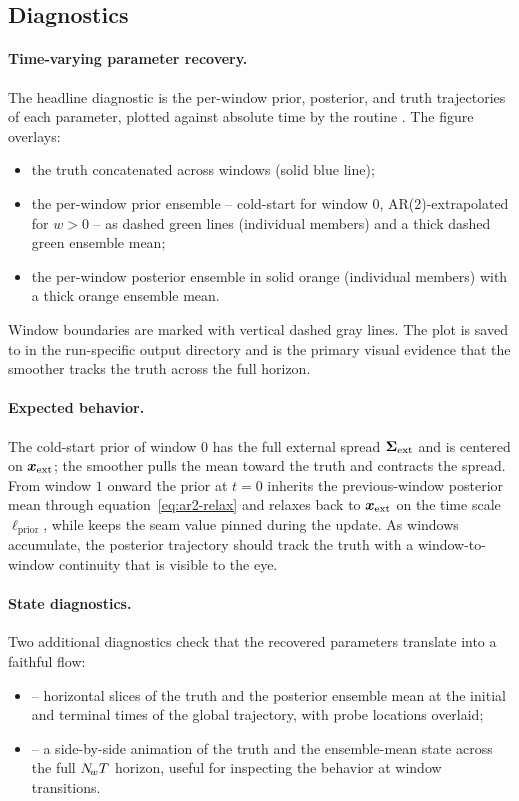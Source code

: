 \subsection{Diagnostics}

\paragraph{Time-varying parameter recovery.}
The headline diagnostic is the per-window prior, posterior, and
truth trajectories of each parameter, plotted against absolute time
by the routine \plothelper{}.  The
figure overlays:
\begin{itemize}
  \item the truth concatenated across windows (solid blue line);
  \item the per-window prior ensemble -- cold-start for window $0$,
        AR(2)-extrapolated for $w > 0$ -- as dashed green lines
        (individual members) and a thick dashed green ensemble mean;
  \item the per-window posterior ensemble in solid orange
        (individual members) with a thick orange ensemble mean.
\end{itemize}
Window boundaries are marked with vertical dashed gray lines.  The
plot is saved to  in the
run-specific output directory and is the primary visual evidence
that the smoother tracks the truth across the full horizon.

\paragraph{Expected behavior.}
The cold-start prior of window $0$ has the full external spread
$\boldsymbol{\Sigma}_{\mathrm{ext}}$ and is centered on $\boldsymbol{x}_{\mathrm{ext}}$; the smoother pulls the mean
toward the truth and contracts the spread.  From window $1$ onward
the prior at $t = 0$ inherits the previous-window posterior mean
through equation~\eqref{eq:ar2-relax} and relaxes back to $\boldsymbol{x}_{\mathrm{ext}}$ on
the time scale $\ell_{\mathrm{prior}}$, while \ESMDA{} keeps the
seam value pinned during the update.  As windows accumulate, the
posterior trajectory should track the truth with a window-to-window
continuity that is visible to the eye.

\paragraph{State diagnostics.}
Two additional diagnostics check that the recovered parameters
translate into a faithful flow:
\begin{itemize}
  \item {} -- horizontal slices of
        the truth and the posterior ensemble mean at the initial and
        terminal times of the global trajectory, with probe
        locations overlaid;
  \item {} -- a side-by-side animation of
        the truth and the ensemble-mean state across the full
        $N_{\!w}T$ horizon, useful for inspecting the
        behavior at window transitions.
\end{itemize}

